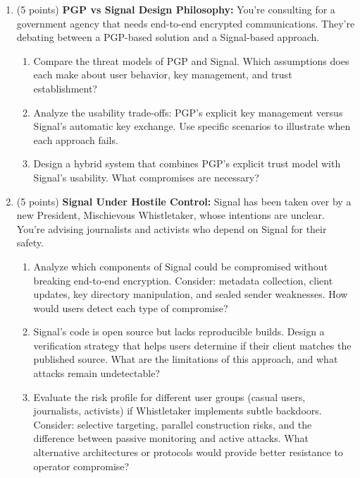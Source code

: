 \documentclass[10pt,a4paper,american]{exam}
\begin{document}
\begin{enumerate}
	\item (5 points) \textbf{PGP vs Signal Design Philosophy:}
	      You're consulting for a government agency that needs end-to-end encrypted communications. They're debating between a PGP-based solution and a Signal-based approach.
	      \begin{enumerate}
		      \item Compare the threat models of PGP and Signal. Which assumptions does each make about user behavior, key management, and trust establishment?
		      \item Analyze the usability trade-offs: PGP's explicit key management versus Signal's automatic key exchange. Use specific scenarios to illustrate when each approach fails.
		      \item Design a hybrid system that combines PGP's explicit trust model with Signal's usability. What compromises are necessary?
	      \end{enumerate}

	\item (5 points) \textbf{Signal Under Hostile Control:}
	      Signal has been taken over by a new President, Mischievous Whistletaker, whose intentions are unclear. You're advising journalists and activists who depend on Signal for their safety.
	      \begin{enumerate}
		      \item Analyze which components of Signal could be compromised without breaking end-to-end encryption. Consider: metadata collection, client updates, key directory manipulation, and sealed sender weaknesses. How would users detect each type of compromise?
		      \item Signal's code is open source but lacks reproducible builds. Design a verification strategy that helps users determine if their client matches the published source. What are the limitations of this approach, and what attacks remain undetectable?
		      \item Evaluate the risk profile for different user groups (casual users, journalists, activists) if Whistletaker implements subtle backdoors. Consider: selective targeting, parallel construction risks, and the difference between passive monitoring and active attacks. What alternative architectures or protocols would provide better resistance to operator compromise?
	      \end{enumerate}


\end{enumerate}
\end{document}
